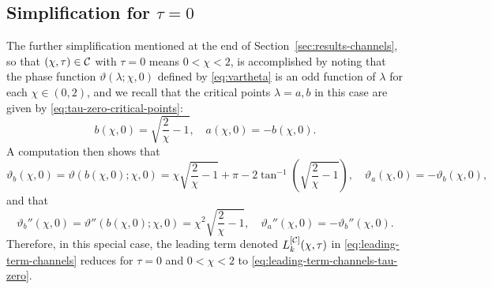 \subsection{Simplification for $\tau=0$}
%
The further simplification mentioned at the end of Section~\ref{sec:results-channels}, so that $(\chi,\tau)\in \mathcal{C}$ with $\tau=0$ means $0<\chi<2$, is accomplished by noting that the phase function $\vartheta(\lambda;\chi,0)$ defined by \eqref{eq:vartheta} is an odd function of $\lambda$ for each $\chi\in (0,2)$, and we recall that the critical points $\lambda=a,b$ in this case are given by \eqref{eq:tau-zero-critical-points}: 
\begin{equation}
b(\chi,0)=\sqrt{\frac{2}{\chi}-1},\quad a(\chi,0)=-b(\chi,0).
\end{equation}
A computation then shows that
\begin{equation}
\vartheta_b(\chi,0)=\vartheta(b(\chi,0);\chi,0)=\chi\sqrt{\frac{2}{\chi}-1}+\pi-2\tan^{-1}\left(\sqrt{\frac{2}{\chi}-1}\right),\quad\vartheta_a(\chi,0)=-\vartheta_b(\chi,0),
\end{equation}
and that
\begin{equation}
\vartheta_b''(\chi,0)=\vartheta''(b(\chi,0);\chi,0)=\chi^2\sqrt{\frac{2}{\chi}-1},\quad\vartheta_a''(\chi,0)=-\vartheta_b''(\chi,0).
\end{equation}
Therefore, in this special case, the leading term denoted $L^{[\mathcal{C}]}_k(\chi,\tau)$ in \eqref{eq:leading-term-channels} reduces for $\tau=0$ and $0<\chi<2$ to \eqref{eq:leading-term-channels-tau-zero}.
